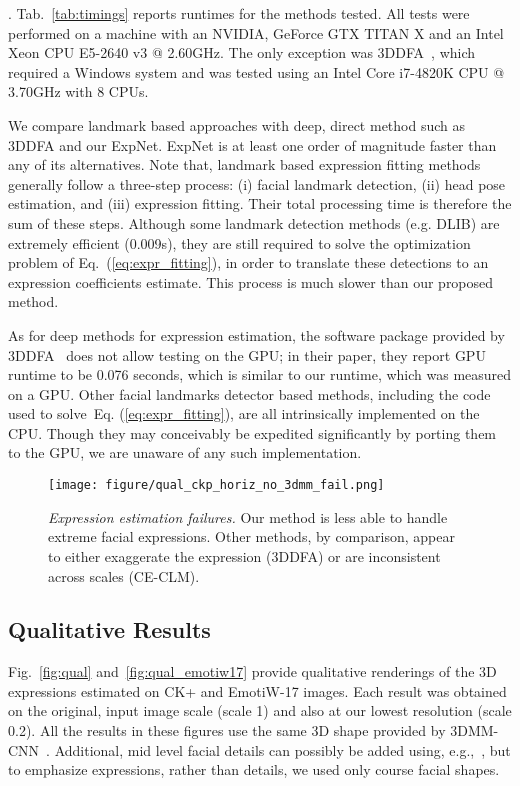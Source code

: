 \documentclass[a4paper, 10pt, conference]{ieeeconf}
\newcommand{\minisection}[1]{\vspace{2mm}\noindent{\bf #1}.}
\begin{document}
{\minisection{Runtime} Tab.~\ref{tab:timings} reports runtimes for the methods tested. All tests were performed on a machine with an NVIDIA, GeForce GTX TITAN X and an Intel Xeon CPU E5-2640 v3 @ 2.60GHz. The only exception was 3DDFA~\cite{zhu2015}, which required a Windows system and was tested using an Intel Core i7-4820K CPU @ 3.70GHz with 8 CPUs.


We compare landmark based approaches with deep, direct method such as 3DDFA and our ExpNet. ExpNet is at least one order of magnitude faster than any of its alternatives. Note that, landmark based expression fitting methods generally follow a three-step process: (i) facial landmark detection, (ii) head pose estimation, and (iii) expression fitting. Their total processing time is therefore the sum of these steps. Although some landmark detection methods (e.g. DLIB) are extremely efficient (0.009s), they are still required to solve the optimization problem of Eq.~(\ref{eq:expr_fitting}), in order to translate these detections to an expression coefficients estimate. This process is much slower than our proposed method.


As for deep methods for expression estimation, the software package provided by 3DDFA~\cite{zhu2015} does not allow testing on the GPU; in their paper, they report GPU runtime to be 0.076 seconds, which is similar to our runtime, which was measured on a GPU. Other facial landmarks detector based methods, including the code used to solve~Eq. (\ref{eq:expr_fitting}), are all intrinsically implemented on the CPU. Though they may conceivably be expedited significantly by porting them to the GPU, we are unaware of any such implementation.


\begin{figure}[tb]
\centering
\texttt{[image: figure/qual\_ckp\_horiz\_no\_3dmm\_fail.png]}
\caption{
{\em Expression estimation failures.} Our method is less able to handle extreme facial expressions. Other methods, by comparison, appear to either exaggerate the expression (3DDFA) or are inconsistent across scales (CE-CLM).
}
\label{fig:qual_fail}
\end{figure}

\subsection{Qualitative Results}\label{sec:qual}
Fig.~\ref{fig:qual} and~\ref{fig:qual_emotiw17} provide qualitative renderings of the 3D expressions estimated on CK+ and EmotiW-17 images. Each result was obtained on the original, input image scale (scale 1) and also at our lowest resolution (scale 0.2). All the results in these figures use the same 3D shape provided by 3DMM-CNN~\cite{tran16_3dmm_cnn}. Additional, mid level facial details can possibly be added using, e.g.,~\cite{tran2017extreme}, but to emphasize expressions, rather than details, we used only course facial shapes. 

}
\end{document}
